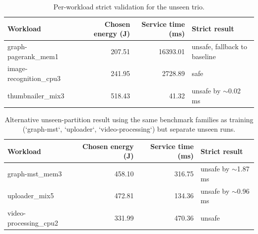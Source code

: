 \begin{table}[t]
\centering
\caption{Per-workload strict validation for the unseen trio.}
\label{tab:slo14-unseen-workload-check}
\begin{tabular}{lrrl}
\toprule
Workload & Chosen energy (J) & Service time (ms) & Strict result \\
\midrule
graph-pagerank\_mem1 & 207.51 & 16393.01 & unsafe, fallback to baseline \\
image-recognition\_cpu3 & 241.95 & 2728.89 & safe \\
thumbnailer\_mix3 & 518.43 & 41.32 & unsafe by $\sim$0.02 ms \\
\bottomrule
\end{tabular}
\end{table}

\begin{table}[t]
\centering
\caption{Alternative unseen-partition result using the same benchmark families as training (`graph-mst`, `uploader`, `video-processing`) but separate unseen runs.}
\label{tab:slo14-alt-unseen-check}
\begin{tabular}{lrrl}
\toprule
Workload & Chosen energy (J) & Service time (ms) & Strict result \\
\midrule
graph-mst\_mem3 & 458.10 & 316.75 & unsafe by $\sim$1.87 ms \\
uploader\_mix5 & 472.81 & 134.36 & unsafe by $\sim$0.96 ms \\
video-processing\_cpu2 & 331.99 & 470.36 & unsafe \\
\bottomrule
\end{tabular}
\end{table}
